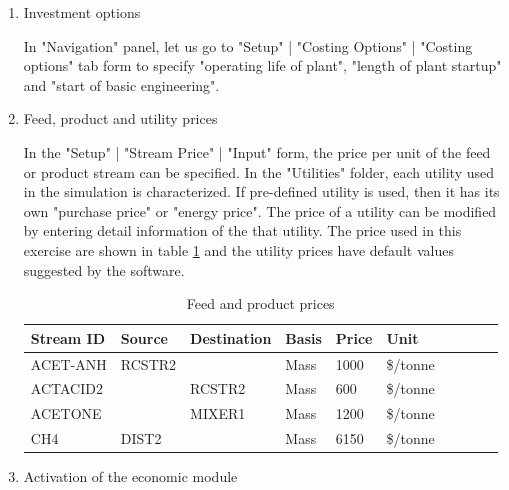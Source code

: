 	\begin{enumerate}[label=\textbf{Step \arabic{enumi}}:,ref=Step \arabic{enumi}]
		
	\item Investment options
	
	In "Navigation" panel, let us go to "Setup" | "Costing Options" | "Costing options" tab form to specify "operating life of plant", "length of plant startup" and "start of basic engineering". %
	

	\item Feed, product and utility prices
	
	In the "Setup" | "Stream Price" | "Input" form, the price per unit of the feed or product stream can be specified. In the "Utilities" folder, each utility used in the simulation is characterized. If pre-defined utility is used, then it has its own "purchase price" or "energy price". The price of a utility can be modified by entering detail information of the that utility. The price used in this exercise are shown in table \ref{tab:Stream_prices} and the utility prices have default values suggested by the software.
	
	\begin{table}[!ht]
		\centering
		\begin{tabular}{|l|l|l|l|l|l|l|l|l|l|}
			\hline
			Stream ID & Source & Destination & Basis & Price & Unit \\ \hline
			ACET-ANH & RCSTR2 & ~ & Mass & 1000 & \$/tonne  \\ \hline
			ACTACID2 & ~ & RCSTR2 & Mass & 600 & \$/tonne   \\ \hline
			ACETONE & ~ & MIXER1 & Mass & 1200 & \$/tonne  \\ \hline
			CH4 & DIST2 & ~ & Mass & 6150 & \$/tonne   \\ \hline
		\end{tabular}
	\caption{Feed and product prices}
	\label{tab:Stream_prices}
	\end{table}
	
	\item Activation of the economic module
	

\end{enumerate}
